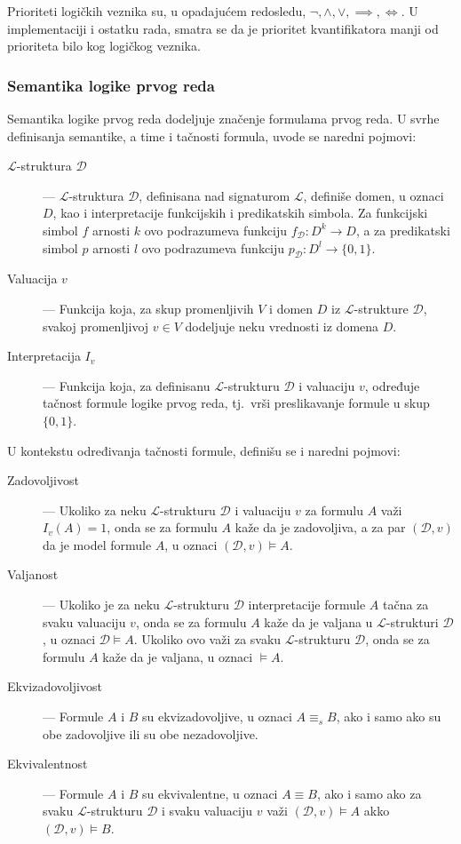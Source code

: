 \documentclass[a4paper,10pt]{article}
\begin{document}
Prioriteti logičkih veznika su, u opadajućem redosledu, $\lnot, \land, \lor, \implies, \iff$. U implementaciji i ostatku rada, smatra se da je prioritet kvantifikatora manji od prioriteta bilo kog logičkog veznika.

\subsubsection{Semantika logike prvog reda}

Semantika logike prvog reda dodeljuje značenje formulama prvog reda. U svrhe definisanja semantike, a time i tačnosti formula, uvode se naredni pojmovi:

\begin{description}
    \item[$\mathcal{L}$-struktura $\mathcal{D}$] --- $\mathcal{L}$-struktura $\mathcal{D}$, definisana nad signaturom $\mathcal{L}$, definiše domen, u oznaci $D$, kao i interpretacije funkcijskih i predikatskih simbola. Za funkcijski simbol $f$ arnosti $k$ ovo podrazumeva funkciju $f_\mathcal{D}:D^k \rightarrow D$, a za predikatski simbol $p$ arnosti $l$ ovo podrazumeva funkciju $p_\mathcal{D}: D^l \rightarrow \{0, 1\}$.
    \item[Valuacija $v$] --- Funkcija koja, za skup promenljivih $V$ i domen $D$ iz $\mathcal{L}$-strukture $\mathcal{D}$, svakoj promenljivoj $v \in V$ dodeljuje neku vrednosti iz domena $D$.
    \item[Interpretacija $I_v$] --- Funkcija koja, za definisanu $\mathcal{L}$-strukturu $\mathcal{D}$ i valuaciju $v$, određuje tačnost formule logike prvog reda, tj.~vrši preslikavanje formule u skup $\{0, 1\}$.
\end{description}

U kontekstu određivanja tačnosti formule, definišu se i naredni pojmovi:
\begin{description}
    \item[Zadovoljivost] --- Ukoliko za neku $\mathcal{L}$-strukturu $\mathcal{D}$ i valuaciju $v$ za formulu $A$ važi $I_v(A) = 1$, onda se za formulu $A$ kaže da je zadovoljiva, a za par $(\mathcal{D}, v)$ da je model formule $A$, u oznaci $(\mathcal{D}, v) \vDash A$.
    \item[Valjanost] --- Ukoliko je za neku $\mathcal{L}$-strukturu $\mathcal{D}$ interpretacije formule $A$ tačna za svaku valuaciju $v$, onda se za formulu $A$ kaže da je valjana u $\mathcal{L}$-strukturi $\mathcal{D}$, u oznaci $\mathcal{D} \vDash A$. Ukoliko ovo važi za svaku $\mathcal{L}$-strukturu $\mathcal{D}$, onda se za formulu $A$ kaže da je valjana, u oznaci $\vDash A$.
    \item[Ekvizadovoljivost] --- Formule $A$ i $B$ su ekvizadovoljive, u oznaci $A \equiv_s B$, ako i samo ako su obe zadovoljive ili su obe nezadovoljive.
    \item[Ekvivalentnost] --- Formule $A$ i $B$ su ekvivalentne, u oznaci $A \equiv B$, ako i samo ako za svaku $\mathcal{L}$-strukturu $\mathcal{D}$ i svaku valuaciju $v$ važi $(\mathcal{D}, v) \vDash A$ akko $(\mathcal{D}, v) \vDash B$.
\end{description}
\end{document}
